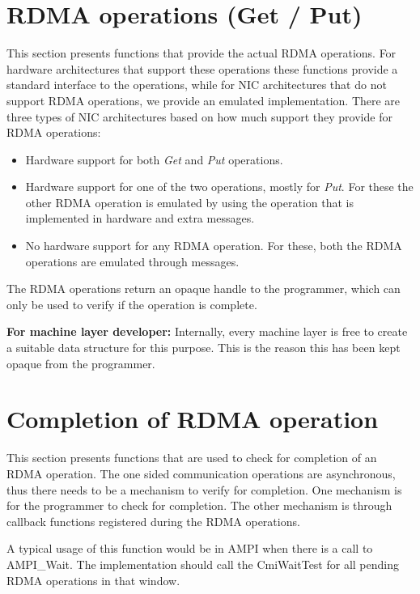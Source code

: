 \section{RDMA operations (Get / Put)}
This section presents functions that provide the actual RDMA operations.
For hardware architectures that support these operations these functions 
provide a standard interface to the operations, while for NIC architectures that
do not support RDMA operations, we provide an emulated implementation.
There are three types of NIC architectures based on how much support they
provide for RDMA operations:
\begin{itemize}
\item Hardware support for both {\it Get} and {\it Put} operations.
\item Hardware support for one of the two operations, mostly for {\it Put}. For these
the other RDMA operation is emulated by using the operation that is implemented
in hardware and extra messages.
\item No hardware support for any RDMA operation. For these, both the RDMA operations
are emulated through messages.
\end{itemize}

The RDMA operations return an opaque handle to the programmer, which can 
only be used to verify if the operation is complete.

{\bf For machine layer developer:} Internally, every machine layer is free
to create a suitable data structure for this purpose. This is the reason this
has been kept opaque from the programmer.




\section{Completion of RDMA operation}
This section presents functions that are used to check for completion
of an RDMA operation. The one sided communication operations are
asynchronous, thus there needs to be a mechanism to verify for completion.
One mechanism is for the programmer to check for completion. The other 
mechanism is through callback functions registered during the RDMA operations.


A typical usage of this function would be in AMPI when there is a call to
AMPI_Wait. The implementation should call the CmiWaitTest for all 
pending RDMA operations in that window.
